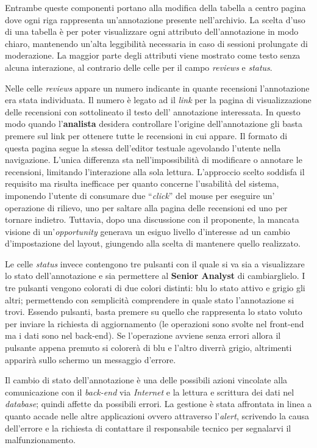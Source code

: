 Entrambe queste componenti portano alla modifica della tabella a centro pagina
dove ogni riga rappresenta un'annotazione presente nell'archivio. La scelta
d'uso di una tabella è per poter visualizzare ogni attributo dell'annotazione
in modo chiaro, mantenendo un'alta leggibilità necessaria in caso di sessioni
prolungate di moderazione. La maggior parte degli attributi viene mostrato come
testo senza alcuna interazione, al contrario delle celle per il campo
\textit{reviews} e \textit{status}.

Nelle celle \textit{reviews} appare un numero indicante in quante recensioni
l'annotazione era stata individuata. Il numero è legato ad il \textit{link} per
la pagina di visualizzazione delle recensioni con sottolineato il testo dell'
annotazione interessata. In questo modo quando l'\textbf{analista} desidera
controllare l'origine dell'annotazione gli basta premere sul link per ottenere
tutte le recensioni in cui appare. Il formato di questa pagina segue la stessa
dell'editor testuale agevolando l'utente nella navigazione. L'unica differenza
sta nell'impossibilità di modificare o annotare le recensioni, limitando
l'interazione alla sola lettura. L'approccio scelto soddisfa il requisito ma
risulta inefficace per quanto concerne l'usabilità del sistema, imponendo
l'utente di consumare due ``\textit{click}'' del mouse per eseguire un'
operazione di rilievo, uno per saltare alla pagina delle recensioni ed uno per
tornare indietro. Tuttavia, dopo una discussione con il proponente, la mancata
visione di un'\textit{opportunity} generava un esiguo livello d'interesse ad un
cambio d'impostazione del layout, giungendo alla scelta di mantenere quello
realizzato.

Le celle \textit{status} invece contengono tre pulsanti con il quale si va sia a
visualizzare lo stato dell'annotazione e sia permettere al
\textbf{Senior Analyst} di cambiarglielo. I tre pulsanti vengono colorati di due
colori distinti: blu lo stato attivo e grigio gli altri; permettendo con
semplicità comprendere in quale stato l'annotazione si trovi. Essendo pulsanti,
basta premere su quello che rappresenta lo stato voluto per inviare la richiesta
di aggiornamento (le operazioni sono svolte nel \gls{front-end} ma i dati sono
nel \gls{back-end}). Se l'operazione avviene senza errori allora il pulsante
appena premuto si colorerà di blu e l'altro diverrà grigio, altrimenti apparirà
sullo schermo un messaggio d'errore.

Il cambio di stato dell'annotazione è una delle possibili azioni vincolate alla
comunicazione con il \textit{back-end} via \textit{Internet} e la lettura e
scrittura dei dati nel \textit{database}; quindi affette da possibili errori.
La gestione è stata affrontata in linea a quanto accade nelle altre
applicazioni ovvero attraverso l'\textit{alert}, scrivendo la causa dell'errore
e la richiesta di contattare il responsabile tecnico per segnalarvi il
malfunzionamento.


